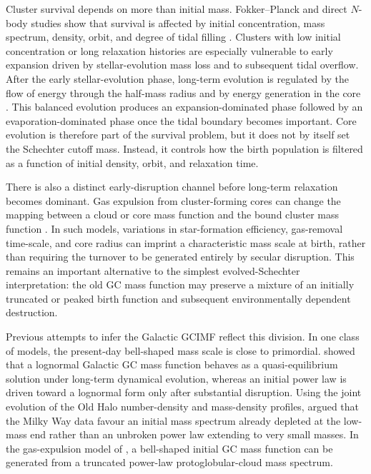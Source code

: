 \documentclass[fleqn,usenatbib]{mnras}
\begin{document}
Cluster survival depends on more than initial mass. Fokker--Planck and direct $N$-body studies show that survival is affected by initial concentration, mass spectrum, density, orbit, and degree of tidal filling \citep{ChernoffWeinberg1990,BaumgardtMakino2003}. Clusters with low initial concentration or long relaxation histories are especially vulnerable to early expansion driven by stellar-evolution mass loss and to subsequent tidal overflow. After the early stellar-evolution phase, long-term evolution is regulated by the flow of energy through the half-mass radius and by energy generation in the core \citep{GielesHeggieZhao2011}. This balanced evolution produces an expansion-dominated phase followed by an evaporation-dominated phase once the tidal boundary becomes important. Core evolution is therefore part of the survival problem, but it does not by itself set the Schechter cutoff mass. Instead, it controls how the birth population is filtered as a function of initial density, orbit, and relaxation time.

There is also a distinct early-disruption channel before long-term relaxation becomes dominant. Gas expulsion from cluster-forming cores can change the mapping between a cloud or core mass function and the bound cluster mass function \citep{ParmentierGilmore2007,Parmentier2008}. In such models, variations in star-formation efficiency, gas-removal time-scale, and core radius can imprint a characteristic mass scale at birth, rather than requiring the turnover to be generated entirely by secular disruption. This remains an important alternative to the simplest evolved-Schechter interpretation: the old GC mass function may preserve a mixture of an initially truncated or peaked birth function and subsequent environmentally dependent destruction.

Previous attempts to infer the Galactic GCIMF reflect this division. In one class of models, the present-day bell-shaped mass scale is close to primordial. \citet{Vesperini1998} showed that a lognormal Galactic GC mass function behaves as a quasi-equilibrium solution under long-term dynamical evolution, whereas an initial power law is driven toward a lognormal form only after substantial disruption. Using the joint evolution of the Old Halo number-density and mass-density profiles, \citet{ParmentierGilmore2005} argued that the Milky Way data favour an initial mass spectrum already depleted at the low-mass end rather than an unbroken power law extending to very small masses. In the gas-expulsion model of \citet{ParmentierGilmore2007}, a bell-shaped initial GC mass function can be generated from a truncated power-law protoglobular-cloud mass spectrum.
\end{document}
